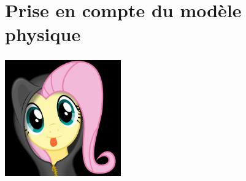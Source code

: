 \documentclass[slidetop,11pt]{beamer}
\begin{document}
\section{Prise en compte du modèle physique}
\begin{frame}
  \frametitle{}
  \begin{center}
    \includegraphics[width=5cm]{fig/fluttershy.jpg}
  \end{center}
\end{frame}
\end{document}
